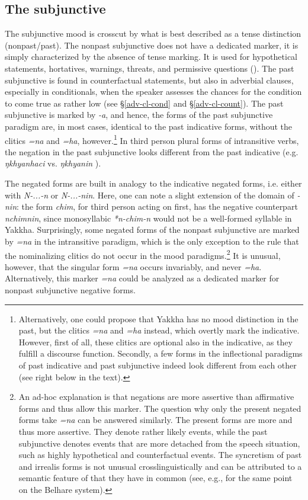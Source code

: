 \subsection{The subjunctive}

The subjunctive mood is crosscut by what is best described as a tense distinction (nonpast/past). The nonpast subjunctive does not have a dedicated marker, it is simply characterized by the absence of tense marking. It is used for hypothetical statements, hortatives, warnings, threats, and permissive questions (). The past subjunctive is found in counterfactual statements, but also in adverbial clauses, especially in conditionals, when the speaker assesses the chances for the condition to come true as rather low (see §\ref{adv-cl-cond} and §\ref{adv-cl-count}). The past subjunctive is marked by \emph{-a}, and hence, the forms of the past subjunctive paradigm are, in most cases, identical to the past indicative forms, without the clitics \emph{=na} and \emph{=ha}, however.\footnote{Alternatively, one could propose that Yakkha has no mood distinction in the past, but the clitics  \emph{=na} and \emph{=ha} instead, which overtly mark the indicative. However, first of all, these clitics are optional also in the indicative, as they fulfill a discourse function. Secondly, a few forms in the inflectional paradigms of past indicative and past subjunctive indeed look different from each other (see right below in the text).} In third person plural forms of intransitive verbs, the negation in the past subjunctive looks different from the past indicative (e.g. \emph{ŋkhyanhaci}  vs. \emph{ŋkhyanin} ). 


The negated forms are built in analogy to the indicative negated forms, i.e. either with \emph{N-...-n} or \emph{N-...-nin}. Here, one can note a slight extension of the domain of \emph{-nin}: the form \emph{chim}, for third person acting on first, has the negative counterpart \emph{nchimnin}, since monosyllabic  \emph{*n-chim-n } would not be a well-formed syllable in Yakkha. Surprisingly, some negated forms of the nonpast subjunctive are marked by \emph{=na} in the intransitive paradigm, which is the only exception to the rule that the nominalizing clitics do not occur in the mood paradigms.\footnote{An ad-hoc explanation is that negations are more assertive than affirmative forms and thus allow this marker. The question why only the present negated forms take \emph{=na} can be answered similarly. The present forms are more  and thus more assertive. They denote rather likely events, while the past subjunctive denotes events that are more detached from the speech situation, such as highly hypothetical and counterfactual events. The syncretism of past and irrealis forms is not unusual crosslinguistically and can be attributed to a semantic feature of  that they have in common (see, e.g., \citet[88]{Bickel1996Aspect} for the same point on the Belhare system).}  It is unusual, however, that the singular form \emph{=na} occurs invariably, and never \emph{=ha}. Alternatively, this marker \emph{=na} could be analyzed as a dedicated marker for nonpast subjunctive negative forms.

